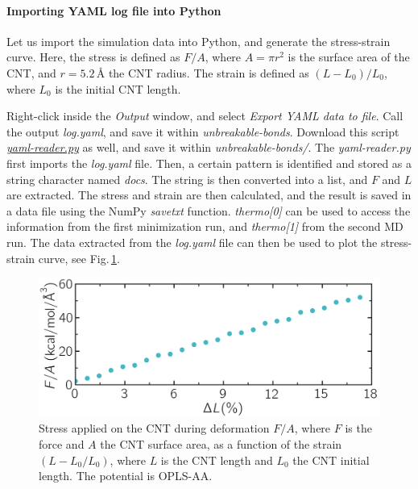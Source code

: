 \documentclass[9pt,tutorial]{livecoms}
\newcommand{\filepath}{https://raw.githubusercontent.com/lammpstutorials/lammpstutorials-article/main/files/}
\begin{document}
\paragraph{Importing YAML log file into Python}

Let us import the simulation data into Python, and generate the stress-strain curve.
Here, the stress is defined as $F/A$, where $A = \pi r^2$ is the surface area of the
CNT, and $r=5.2$\,\AA{} the CNT radius. The strain is defined as $(L-L_0)/L_0$,
where $L_0$ is the initial CNT length.

Right-click inside the \textit{Output} window, and select
\textit{Export YAML data to file}. Call the output \textit{log.yaml}, and save
it within \textit{unbreakable-bonds}. Download this script
\href{\filepath tutorial2/unbreakable-bonds/yaml-reader.py}{\textit{yaml-reader.py}} as well, and save it
within \textit{unbreakable-bonds/}. The \textit{yaml-reader.py} first imports
the \textit{log.yaml} file. Then, a certain pattern is
identified and stored as a string character named \textit{docs}. The string is
then converted into a list, and $F$ and $L$ are extracted. The stress and strain
are then calculated, and the result is saved in a data file using the
NumPy \textit{savetxt} function. \textit{thermo[0]} can be used to access the
information from the first minimization run, and \textit{thermo[1]} from
the second MD run. The data extracted from the \textit{log.yaml} file can
then be used to plot the stress-strain curve, see
Fig.\,\ref{fig:CNT-stress-strain-unbreakable}.

\begin{figure}
\centering
\includegraphics[width=\linewidth]{CNT-stress-strain-unbreakable}
\caption{Stress applied on the CNT during deformation $F/A$, where $F$ is the force
and $A$ the CNT surface area, as a function of the strain $(L-L_0/L_0)$, where
$L$ is the CNT length and $L_0$ the CNT initial length. The potential is OPLS-AA.}
\label{fig:CNT-stress-strain-unbreakable}
\end{figure}
\end{document}
